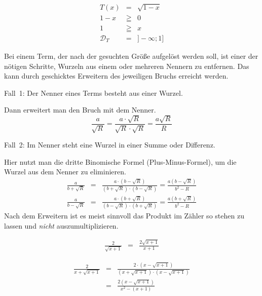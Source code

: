 \begin{bsp}
 \begin{eqnarray*}
  T(x) &=& \sqrt{1-x}\\
  1-x &\geqq& 0 \\
  1 &\geqq & x \\
  \mathcal{D}_T &=& ]-\infty ; 1]
 \end{eqnarray*}

\end{bsp}


\begin{regel}
 Bei einem Term, der nach der gesuchten Größe aufgelöst werden soll, ist einer der nötigen Schritte, Wurzeln aus einem oder mehreren Nennern zu entfernen. Das kann durch geschicktes Erweitern des jeweiligen Bruchs erreicht werden.
 
 Fall~1: Der Nenner eines Terms besteht aus einer Wurzel.
 
 Dann erweitert man den Bruch mit dem Nenner.
 \begin{equation*}
  \frac{a}{\sqrt{R}} = \frac{a\cdot \sqrt{R}}{\sqrt{R}\cdot\sqrt{R}} = \frac{a\sqrt{R}}{R} 
 \end{equation*}
 
 Fall~2: Im Nenner steht eine Wurzel in einer Summe oder Differenz.
 
 Hier nutzt man die dritte Binomische Formel (Plus-Minus-Formel), um die Wurzel aus dem Nenner zu eliminieren.
 \begin{eqnarray*}
  \frac{a}{b+\sqrt{R}} &=& \frac{a\cdot \left(b-\sqrt{R}\right)}{\left(b+\sqrt{R}\right)\cdot \left(b-\sqrt{R}\right)} = \frac{a\left(b-\sqrt{R}\right)}{b^2-R}\\
  \frac{a}{b-\sqrt{R}} &=& \frac{a\cdot \left(b+\sqrt{R}\right)}{\left(b-\sqrt{R}\right)\cdot \left(b+\sqrt{R}\right)} = \frac{a\left(b+\sqrt{R}\right)}{b^2-R}
 \end{eqnarray*}
 Nach dem Erweitern ist es meist sinnvoll das Produkt im Zähler so stehen zu lassen und \emph{nicht} auszumultiplizieren.
\end{regel}

\begin{bsp}
 \begin{eqnarray*}
  \frac{2}{\sqrt{x+1}} &=& \frac{2\sqrt{x+1}}{x+1}
 \end{eqnarray*}
\end{bsp}
\begin{bsp}
 \begin{eqnarray*}
  \frac{2}{x+\sqrt{x+1}} &=& \frac{2\cdot \left(x-\sqrt{x+1}\right)}{\left(x+\sqrt{x+1}\right)\cdot \left(x-\sqrt{x+1}\right)} \\ &=& \frac{2\left(x-\sqrt{x+1}\right)}{x^2-(x+1)}
 \end{eqnarray*}
\end{bsp}

